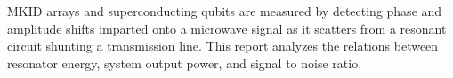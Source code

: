 
MKID arrays and superconducting qubits are measured by detecting phase and amplitude shifts imparted onto a microwave signal as it scatters from a resonant circuit shunting a transmission line.
This report analyzes the relations between resonator energy, system output power, and signal to noise ratio.
